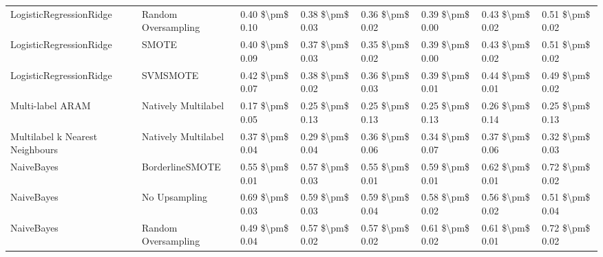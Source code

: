 \begin{tabular}{llllllll}
        LogisticRegressionRidge &           Random Oversampling & 0.40 \$\textbackslash pm\$ 0.10 &           0.38 \$\textbackslash pm\$ 0.03 &       0.36 \$\textbackslash pm\$ 0.02 &        0.39 \$\textbackslash pm\$ 0.00 &                         0.43 \$\textbackslash pm\$ 0.02 & 0.51 \$\textbackslash pm\$ 0.02 \\
        LogisticRegressionRidge &                         SMOTE & 0.40 \$\textbackslash pm\$ 0.09 &           0.37 \$\textbackslash pm\$ 0.03 &       0.35 \$\textbackslash pm\$ 0.02 &        0.39 \$\textbackslash pm\$ 0.00 &                         0.43 \$\textbackslash pm\$ 0.02 & 0.51 \$\textbackslash pm\$ 0.02 \\
        LogisticRegressionRidge &                      SVMSMOTE & 0.42 \$\textbackslash pm\$ 0.07 &           0.38 \$\textbackslash pm\$ 0.02 &       0.36 \$\textbackslash pm\$ 0.03 &        0.39 \$\textbackslash pm\$ 0.01 &                         0.44 \$\textbackslash pm\$ 0.01 & 0.49 \$\textbackslash pm\$ 0.02 \\
               Multi-label ARAM &           Natively Multilabel & 0.17 \$\textbackslash pm\$ 0.05 &           0.25 \$\textbackslash pm\$ 0.13 &       0.25 \$\textbackslash pm\$ 0.13 &        0.25 \$\textbackslash pm\$ 0.13 &                         0.26 \$\textbackslash pm\$ 0.14 & 0.25 \$\textbackslash pm\$ 0.13 \\
Multilabel k Nearest Neighbours &           Natively Multilabel & 0.37 \$\textbackslash pm\$ 0.04 &           0.29 \$\textbackslash pm\$ 0.04 &       0.36 \$\textbackslash pm\$ 0.06 &        0.34 \$\textbackslash pm\$ 0.07 &                         0.37 \$\textbackslash pm\$ 0.06 & 0.32 \$\textbackslash pm\$ 0.03 \\
                     NaiveBayes &               BorderlineSMOTE & 0.55 \$\textbackslash pm\$ 0.01 &           0.57 \$\textbackslash pm\$ 0.03 &       0.55 \$\textbackslash pm\$ 0.01 &        0.59 \$\textbackslash pm\$ 0.01 &                         0.62 \$\textbackslash pm\$ 0.01 & 0.72 \$\textbackslash pm\$ 0.02 \\
                     NaiveBayes &                 No Upsampling & 0.69 \$\textbackslash pm\$ 0.03 &           0.59 \$\textbackslash pm\$ 0.03 &       0.59 \$\textbackslash pm\$ 0.04 &        0.58 \$\textbackslash pm\$ 0.02 &                         0.56 \$\textbackslash pm\$ 0.02 & 0.51 \$\textbackslash pm\$ 0.04 \\
                     NaiveBayes &           Random Oversampling & 0.49 \$\textbackslash pm\$ 0.04 &           0.57 \$\textbackslash pm\$ 0.02 &       0.57 \$\textbackslash pm\$ 0.02 &        0.61 \$\textbackslash pm\$ 0.02 &                         0.61 \$\textbackslash pm\$ 0.01 & 0.72 \$\textbackslash pm\$ 0.02 \\

\end{tabular}
